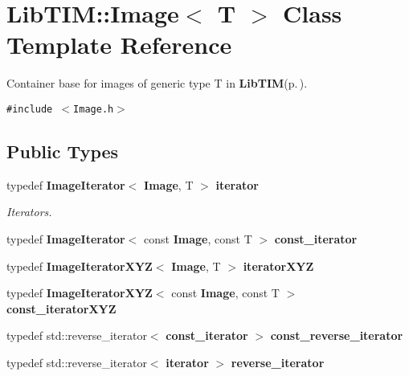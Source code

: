 \section{Lib\-TIM::Image$<$ T $>$ Class Template Reference}
\label{classLibTIM_1_1Image}
Container base for images of generic type T in {\bf Lib\-TIM}{\rm (p.\,\pageref{namespaceLibTIM})}.  


{\tt \#include $<$Image.h$>$}

\subsection*{Public Types}
\begin{CompactItemize}
\item 
typedef {\bf Image\-Iterator}$<$ {\bf Image}, T $>$ {\bf iterator}
\begin{CompactList}\small\item\em Iterators. \item\end{CompactList}\item 
typedef {\bf Image\-Iterator}$<$ const {\bf Image}, const T $>$ {\bf const\_\-iterator}
\item 
typedef {\bf Image\-Iterator\-XYZ}$<$ {\bf Image}, T $>$ {\bf iterator\-XYZ}
\item 
typedef {\bf Image\-Iterator\-XYZ}$<$ const {\bf Image}, const T $>$ {\bf const\_\-iterator\-XYZ}
\item 
typedef std::reverse\_\-iterator$<$ {\bf const\_\-iterator} $>$ {\bf const\_\-reverse\_\-iterator}
\item 
typedef std::reverse\_\-iterator$<$ {\bf iterator} $>$ {\bf reverse\_\-iterator}
\end{CompactItemize}
